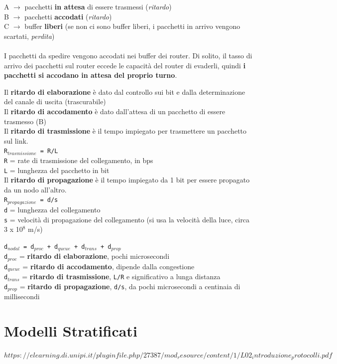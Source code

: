 \documentclass[10pt]{article}
\begin{document}
\begin{list}{}{Tramite una serie di metriche:}
\begin{multicols}{2}
\columnbreak
A $\rightarrow$ pacchetti \textbf{in attesa} di essere trasmessi (\emph{ritardo})\\
B $\rightarrow$ pacchetti \textbf{accodati} (\emph{ritardo})\\
C $\rightarrow$ buffer \textbf{liberi} (se non ci sono buffer liberi, i pacchetti in arrivo vengono scartati, \emph{perdita})\\\\
I pacchetti da spedire vengono accodati nei buffer dei router. Di solito, il tasso di arrivo dei pacchetti sul router eccede le capacità del router di evaderli, quindi \textbf{i pacchetti si accodano in attesa del proprio turno}.
\end{multicols}
Il \textbf{ritardo di elaborazione} è dato dal controllo sui bit e dalla determinazione del canale di uscita (trascurabile)\\
Il \textbf{ritardo di accodamento} è dato dall'attesa di un pacchetto di essere trasmesso (B)\\
Il \textbf{ritardo di trasmissione} è il tempo impiegato per trasmettere un pacchetto sul link.\\\texttt{R$_{trasmissione}$ = R/L}\\
\texttt{R} = rate di trasmissione del collegamento, in bps\\
\texttt{L} = lunghezza del pacchetto in bit\\
Il \textbf{ritardo di propagazione} è il tempo impiegato da 1 bit per essere propagato da un nodo all'altro.\\\texttt{R$_{propagazione}$ = d/s}\\
\texttt{d} = lunghezza del collegamento\\
\texttt{s} = velocità di propagazione del collegamento (si usa la velocità della luce, circa 3 x 10$^{8}$ m/s)
\end{list}
\texttt{d$_{nodal}$ = d$_{proc}$ + d$_{queue}$ + d$_{trans}$ + d$_{prop}$}\\
\texttt{d$_{proc}$} = \textbf{ritardo di elaborazione}, pochi microsecondi\\
\texttt{d$_{queue}$} = \textbf{ritardo di accodamento}, dipende dalla congestione\\
\texttt{d$_{trans}$} = \textbf{ritardo di trasmissione}, \texttt{L/R} e significativo a lunga distanza\\
\texttt{d$_{prop}$} = \textbf{ritardo di propagazione}, \texttt{d/s}, da pochi microsecondi a centinaia di millisecondi\\
\section{Modelli Stratificati}
$https://elearning.di.unipi.it/pluginfile.php/27387/mod_resource/content/1/L02_introduzione_protocolli.pdf$
\end{document}
